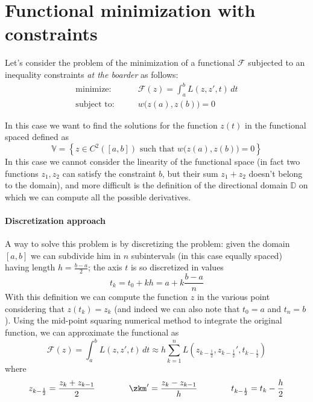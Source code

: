 	\section{Functional minimization with constraints}
	Let's consider the problem of the minimization of a functional $\mathcal F$ subjected to an inequality constraints \textit{at the boarder} as follows:
	\begin{equation} \label{eq:func:origconst}
		\begin{aligned} 
			\textrm{minimize:}& \qquad \mathcal F(z) = \int_a^b L (z,z',t)\, dt \\
			\textrm{subject to:}& \qquad w\big(z(a),z(b) \big) = 0
		\end{aligned}
	\end{equation}
	
	In this case we want to find the solutions for the function $z(t)$ in the functional spaced defined as
	\[\mathds V = \left\{ z \in C^2([a,b]) \textrm{ such that } w\big(z(a),z(b)\big) = 0 \right\}  \]
	In this case we cannot consider the linearity of the functional space (in fact two functions $z_1,z_2$ can satisfy the constraint $b$, but their sum $z_1 + z_2$ doesn't belong to the domain), and more difficult is the definition of the directional domain $\mathds D$ on which we can compute all the possible derivatives. 
	
	\paragraph{Discretization approach} A way to solve this problem is by discretizing the problem: given the domain $[a,b]$ we can subdivide him in $n$ subintervals (in this case equally spaced) having length $h = \frac{b-a}{2}$; the axis $t$ is so discretized in values
	\[ t_k = t_0 + k h = a + k \frac {b-a}n  \]
	With this definition we can compute the function $z$ in the various point considering that $z(t_k)=z_k$ (and indeed we can also note that $t_0 = a$ and $t_n = b$). Using the mid-point squaring numerical method to integrate the original function, we can approximate the functional as
	\[ \mathcal F(z) = \int_a^b L (z,z',t)\, dt \approx h \sum_{k=1}^{n} L  \left( z_{k-\frac 1 2}, z_{k-\frac 1 2}', t_{k-\frac 1 2} \right) \]
	where 
	\[ z_{k-\frac 12} = \frac{z_k + z_{k-1}}{2} \qquad \qquad \zkm ' = \frac{z_k - z_{k-1}}{h} \qquad \qquad t_{k-\frac 12} = t_k - \frac h 2 \]
	
